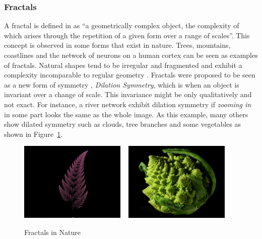 
\subsubsection{Fractals} %
\label{ssub:fractals}


A fractal is defined in \cite{Ebert2002} as ``a geometrically complex object, the complexity of which arises through the repetition of a given form over a range of scales''.
This concept is observed in some forms that exist in nature. Trees, mountains, coastlines and the network of neurons on a human cortex can be seen as examples of fractals. Natural shapes tend to be irregular and fragmented and exhibit a complexity incomparable to regular geometry \cite{mandelbrot1984fractal}.
Fractals were proposed to be seen as a new form of symmetry \cite{Ebert2002}, \emph{Dilation Symmetry}, which is when an object is invariant over a change of scale. This invariance might be only qualitatively and not exact. For instance, a river network exhibit dilation symmetry if \textit{zooming in} in some part looks the same as the whole image. As this example, many others show dilated symmetry such as clouds, tree branches and some vegetables as shown in Figure~\ref{fig:NFractals}. 

\begin{figure}
        \centering
                \includegraphics[width=0.45\textwidth]{img/Theory/Fractals/Leaf.png}
        ~ %
                \includegraphics[width=0.45\textwidth]{img/Theory/Fractals/Fractal_Broccoli.jpg}
        \caption{Fractals in Nature}
        \label{fig:NFractals}
\end{figure}


